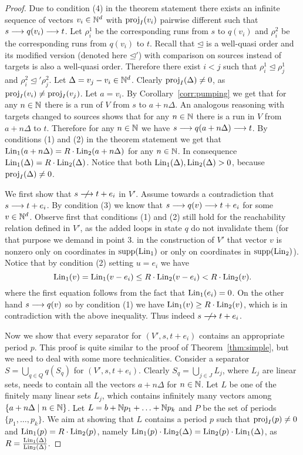 \begin{proof}
Due to condition (4) in the theorem statement there exists an infinite sequence of vectors $v_i \in \mathbb{N}^d$ with $\textup{proj}_I(v_i)$ pairwise different
such that $s \longrightarrow q(v_i) \longrightarrow t$. Let $\rho^1_i$ be the corresponding runs from $s$ to $q(v_i)$
and $\rho^2_i$ be the corresponding runs from $q(v_i)$ to $t$.
Recall that $\unlhd$ is a well-quasi order and its modified version (denoted here $\unlhd'$) with comparison on sources instead of targets
is also a well-quasi order.
Therefore there exist $i < j$ such that $\rho^1_i \unlhd \rho^1_j$ and $\rho^2_i \unlhd' \rho^2_j$.
Let $\Delta = v_j - v_i \in \mathbb{N}^d$. Clearly $\textup{proj}_I(\Delta) \neq 0$, as $\textup{proj}_I(v_i) \neq \textup{proj}_I(v_j)$. Let $a = v_i$.
By Corollary~\ref{corr:pumping} we get that for any $n \in \mathbb{N}$ there is a run of $V$ from $s$ to $a + n\Delta$.
An analogous reasoning with targets changed to sources shows that for any $n \in \mathbb{N}$ there is a run in $V$
from $a + n\Delta$ to $t$. Therefore for any $n \in \mathbb{N}$ we have $s \longrightarrow q(a + n\Delta) \longrightarrow t$.
By conditions (1) and (2) in the theorem statement we get that $\textup{Lin}_1(a + n \Delta) = R \cdot \textup{Lin}_2(a + n \Delta)$
for any $n \in \mathbb{N}$. In consequence $\textup{Lin}_1(\Delta) = R \cdot \textup{Lin}_2(\Delta)$. Notice that both $\textup{Lin}_1(\Delta), \textup{Lin}_2(\Delta) > 0$,
because $\textup{proj}_I(\Delta) \neq 0$.

We first show that $s \nreaches t+e_i$ in $V'$. %
Assume towards a contradiction that $s \longrightarrow t+e_i$. By condition (3) we know
that $s \longrightarrow q(v) \longrightarrow t+e_i$ for some $v \in \mathbb{N}^d$.
Observe first that conditions (1) and (2) still hold for the reachability relation defined in $V'$, as the added loops in state $q$
do not invalidate them (for that purpose we demand in point 3. in the construction of $V'$
that vector $v$ is nonzero only on coordinates in $\textup{supp}(\textup{Lin}_1)$ or only on coordinates in $\textup{supp}(\textup{Lin}_2)$).
Notice that by condition (2) setting $u = e_i$ we have
\[
\textup{Lin}_1(v) = \textup{Lin}_1(v - e_i) \leq R \cdot \textup{Lin}_2(v - e_i) < R \cdot \textup{Lin}_2(v).
\]
where the first equation follows from the fact that $\textup{Lin}_1(e_i) = 0$.
On the other hand $s \longrightarrow q(v)$ so by condition (1) we have $\textup{Lin}_1(v) \geq R \cdot \textup{Lin}_2(v)$, which is in contradiction
with the above inequality. Thus indeed $s \nreaches t+e_i$.

Now we show that every separator for $(V', s, t+e_i)$ contains an appropriate period $p$.
This proof is quite similar to the proof of Theorem~\ref{thm:simple}, but we need to deal with some more technicalities.
Consider a separator $S = \bigcup_{q \in Q} q(S_q)$ for $(V', s, t+e_i)$.
Clearly $S_q = \bigcup_{j \in J} L_j$, where $L_j$ are linear sets, needs to contain all the vectors $a + n \Delta$ for $n \in \mathbb{N}$.
Let $L$ be one of the finitely many linear sets $L_j$, which contains infinitely many vectors among $\{a + n \Delta \mid n \in \mathbb{N}\}$.
Let $L = b + \mathbb{N} p_1 + \ldots + \mathbb{N} p_k$ and $P$ be the set of periods $\{p_1, \ldots, p_k\}$.
We aim at showing that $L$ contains a period $p$ such that $\textup{proj}_I(p) \neq 0$ and $\textup{Lin}_1(p) = R \cdot \textup{Lin}_2(p)$,
namely $\textup{Lin}_1(p) \cdot \textup{Lin}_2(\Delta) = \textup{Lin}_2(p) \cdot \textup{Lin}_1(\Delta)$, as $R = \frac{\textup{Lin}_1(\Delta)}{\textup{Lin}_2(\Delta)}$.


\end{proof}
